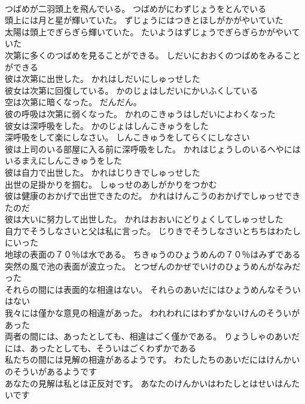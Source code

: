 \documentclass[8pt]{extreport}
\begin{document}
\begin{CJK}{UTF8}{min}
\\	つばめが二羽頭上を飛んでいる。	つばめがにわずじょうをとんでいる 
\\	頭上には月と星が輝いていた。	ずじょうにはつきとほしがかがやいていた 
\\	太陽は頭上でぎらぎら輝いていた。	たいようはずじょうでぎらぎらかがやいていた 
\\	次第に多くのつばめを見ることができる。	しだいにおおくのつばめをみることができる 
\\	彼は次第に出世した。	かれはしだいにしゅっせした 
\\	彼女は次第に回復している。	かのじょはしだいにかいふくしている 
\\	空は次第に暗くなった。	だんだん。
\\	彼の呼吸は次第に弱くなった。	かれのこきゅうはしだいによわくなった 
\\	彼女は深呼吸をした。	かのじょはしんこきゅうをした 
\\	深呼吸をして楽にしなさい。	しんこきゅうをしてらくにしなさい 
\\	彼は上司のいる部屋に入る前に深呼吸をした。	かれはじょうしのいるへやにはいるまえにしんこきゅうをした 
\\	彼は自力で出世した。	かれはじりきでしゅっせした 
\\	出世の足掛かりを掴む。	しゅっせのあしがかりをつかむ 
\\	彼は健康のおかげで出世できたのだ。	かれはけんこうのおかげでしゅっせできたのだ 
\\	彼は大いに努力して出世した。	かれはおおいにどりょくしてしゅっせした 
\\	自力でそうしなさいと父は私に言った。	じりきでそうしなさいとちちはわたしにいった 
\\	地球の表面の７０％は水である。	ちきゅうのひょうめんの７０％はみずである 
\\	突然の風で池の表面が波立った。	とつぜんのかぜでいけのひょうめんがなみだった 
\\	それらの間には表面的な相違はない。	それらのあいだにはひょうめんなそういはない 
\\	我々には僅かな意見の相違があった。	われわれにはわずかないけんのそういがあった 
\\	両者の間には、あったとしても、相違はごく僅かである。	りょうしゃのあいだには、あったとしても、そういはごくわずかである 
\\	私たちの間には見解の相違があるようです。	わたしたちのあいだにはけんかいのそういがあるようです 
\\	あなたの見解は私とは正反対です。	あなたのけんかいはわたしとはせいはんたいです 

\end{CJK}
\end{document}
